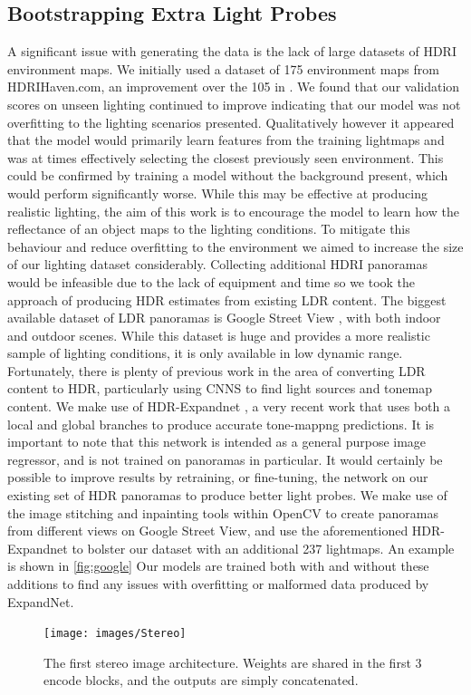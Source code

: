 \documentclass[ %
                    author={Gavin Parker},
                supervisor={Dr. Neill Campbell},
                    degree={MEng},
                     title={Deep Learning for Illumination Estimation from Stereo Images},
                  subtitle={},
                      type={Research},
                      year={2018} ]{dissertation}
\begin{document}
\subsection{Bootstrapping Extra Light Probes}
A significant issue with generating the data is the lack of large datasets of HDRI environment maps. We initially used a dataset of 175 environment maps from HDRIHaven.com, an improvement over the 105 in \cite{RematasCVPR2016}. We found that our validation scores on unseen lighting continued to improve indicating that our model was not overfitting to the lighting scenarios presented. Qualitatively however it appeared that the model would primarily learn features from the training lightmaps and was at times effectively selecting the closest previously seen environment. This could be confirmed by training a model without the background present, which would perform significantly worse. While this may be effective at producing realistic lighting, the aim of this work is to encourage the model to learn how the reflectance of an object maps to the lighting conditions. To mitigate this behaviour and reduce overfitting to the environment we aimed to increase the size of our lighting dataset considerably. 
\newline
Collecting additional HDRI panoramas would be infeasible due to the lack of equipment and time so we took the approach of producing HDR estimates from existing LDR content. The biggest available dataset of LDR panoramas is Google Street View \cite{GoogleMaps}, with both indoor and outdoor scenes. While this dataset is huge and provides a more realistic sample of lighting conditions, it is only available in low dynamic range. Fortunately, there is plenty of previous work in the area of converting LDR content to HDR, particularly using CNNS to find light sources and tonemap content. We make use of HDR-Expandnet \cite{2018arXiv180302266M}, a very recent work that uses both a local and global branches to produce accurate tone-mappng predictions. It is important to note that this network is intended as a general purpose image regressor, and is not trained on panoramas in particular. It would certainly be possible to improve results by retraining, or fine-tuning, the network on our existing set of HDR panoramas to produce better light probes. We make use of the image stitching and inpainting tools within OpenCV to create panoramas from different views on Google Street View, and use the aforementioned HDR-Expandnet to bolster our dataset with an additional 237 lightmaps. An example is shown in \ref{fig:google} Our models are trained both with and without these additions to find any issues with overfitting or malformed data produced by ExpandNet.
\begin{figure}[H]
\centering
\texttt{[image: images/Stereo]}
\caption 
\newline
The first stereo image architecture. Weights are shared in the first 3 encode blocks, and the outputs are simply concatenated.
\label{fig:basic}
\end{figure}
\end{document}
